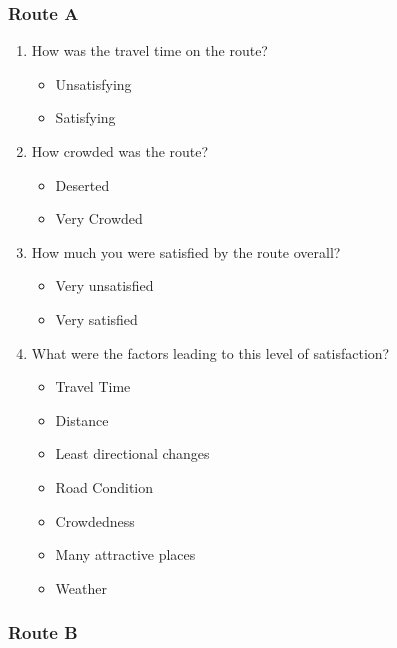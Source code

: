 \subsubsection{Route A}

\begin{enumerate}
    \setcounter{enumi}{\value{surveyCounter}}
    
    \item How was the travel time on the route? 
    \begin{itemize}
        \item Unsatisfying
        \item Satisfying
    \end{itemize}
    
    \item How crowded was the route?
    \begin{itemize}
        \item Deserted
        \item Very Crowded
    \end{itemize}
    
    \item How much you were satisfied by the route overall? 
    \begin{itemize}
        \item Very unsatisfied
        \item Very satisfied
    \end{itemize}
    
    \item What were the factors leading to this level of satisfaction?
    \begin{itemize}
        \item Travel Time
        \item Distance
        \item Least directional changes
        \item Road Condition
        \item Crowdedness
        \item Many attractive places
        \item Weather
    \end{itemize}
    
    
    \setcounter{surveyCounter}{\value{enumi}}
\end{enumerate}

\subsubsection{Route B}

